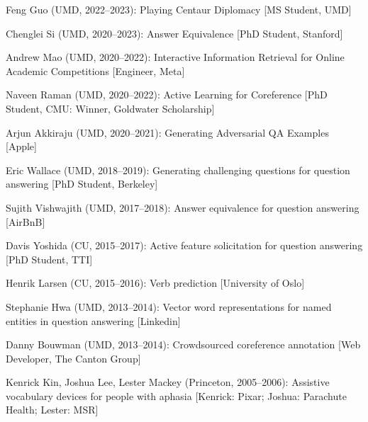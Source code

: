     \begin{enumerate*}
    \item Feng Guo (UMD, 2022--2023): Playing Centaur Diplomacy [MS Student, UMD]
  \item Chenglei Si (UMD, 2020--2023): Answer Equivalence [PhD Student, Stanford]        
    \item Andrew Mao (UMD, 2020--2022): Interactive Information Retrieval
      for Online Academic Competitions    [Engineer, Meta]
    \item Naveen Raman (UMD, 2020--2022): Active Learning for Coreference [PhD Student, CMU: Winner, Goldwater Scholarship]
    \item Arjun Akkiraju (UMD, 2020--2021): Generating Adversarial QA Examples     [Apple]
  \item Eric Wallace (UMD, 2018--2019): Generating challenging questions for
    question answering [PhD Student, Berkeley]
  \item Sujith Vishwajith (UMD, 2017--2018): Answer equivalence for question answering [AirBnB]
  \item Davis Yoshida (CU, 2015--2017): Active feature solicitation for question answering [PhD Student, TTI]
  \item Henrik Larsen (CU, 2015--2016): Verb prediction [University of Oslo]
  \item Stephanie Hwa (UMD, 2013--2014): Vector word representations for named entities in question answering [Linkedin]
  \item Danny Bouwman (UMD, 2013--2014): Crowdsourced coreference annotation [Web Developer, The Canton Group]
  \item Kenrick Kin, Joshua Lee, Lester Mackey (Princeton, 2005--2006): Assistive vocabulary devices
    for people with aphasia [Kenrick: Pixar; Joshua: Parachute Health; Lester: MSR]
\end{enumerate*}
